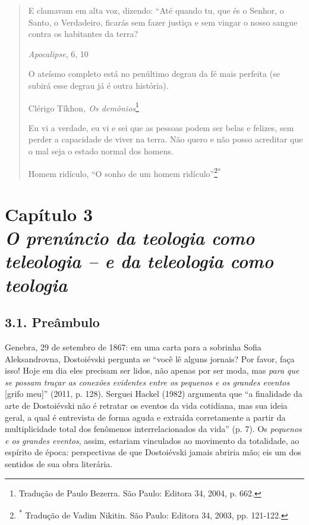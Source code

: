 \begin{quote}
E clamavam em alta voz, dizendo: ``Até quando tu, que és o Senhor, o
Santo, o Verdadeiro, ficarás sem fazer justiça e sem vingar o nosso
sangue contra os habitantes da terra?

\emph{Apocalipse}, 6, 10

O ateísmo completo está no penúltimo degrau da fé mais perfeita (se
subirá esse degrau já é outra história).

Clérigo Tíkhon\emph{, Os demônios}\footnote{Tradução de Paulo Bezerra.
  São Paulo: Editora 34, 2004, p. 662.}

Eu vi a verdade, eu vi e sei que as pessoas podem ser belas e felizes,
sem perder a capacidade de viver na terra. Não quero e não posso
acreditar que o mal seja o estado normal dos homens.

Homem ridículo, ``O sonho de um homem ridículo''\footnote{\textsuperscript{*}
  Tradução de Vadim Nikitin. São Paulo: Editora 34, 2003, pp. 121-122.}\textsuperscript{*}
\end{quote}

\chapter*{Capítulo 3\\
\bigskip
\emph{O prenúncio da teologia como teleologia -- e da teleologia como teologia}}


\section{3.1. Preâmbulo}

Genebra, 29 de setembro de 1867: em uma carta para a sobrinha Sofia
Aleksandrovna, Dostoiévski pergunta se ``você lê alguns jornais? Por
favor, faça isso! Hoje em dia eles precisam ser lidos, não apenas por
ser moda, mas \emph{para que se possam traçar as conexões evidentes
entre os pequenos e os grandes eventos} {[}grifo meu{]}'' (2011, p.
128). Serguei Hackel (1982) argumenta que ``a finalidade da arte de
Dostoiévski não é retratar os eventos da vida cotidiana, mas sua ideia
geral, a qual é entrevista de forma aguda e extraída corretamente a
partir da multiplicidade total dos fenômenos interrelacionados da vida''
(p. 7). Os \emph{pequenos e os} \emph{grandes eventos}, assim, estariam
vinculados ao movimento da totalidade, ao espírito de época:
perspectivas de que Dostoiévski jamais abriria mão; eis um dos sentidos
de sua obra literária.

